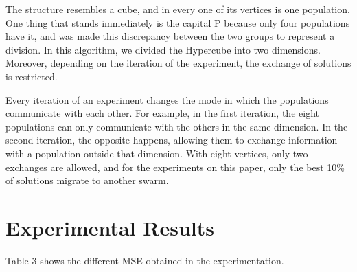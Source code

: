 \documentclass[runningheads]{llncs}
\begin{document}
The structure resembles a cube, and in every one of its vertices is one population. One thing that stands immediately is the capital P because only four populations have it, and was made this discrepancy between the two groups to represent a division. In this algorithm, we divided the Hypercube into two dimensions. Moreover, depending on the iteration of the experiment, the exchange of solutions is restricted.

Every iteration of an experiment changes the mode in which the populations communicate with each other. For example, in the first iteration, the eight populations can only communicate with the others in the same dimension. In the second iteration, the opposite happens, allowing them to exchange information with a population outside that dimension.   With eight vertices, only two exchanges are allowed, and for the experiments on this paper, only the best 10\% of solutions migrate to another swarm. 

\section{Experimental Results}
Table 3 shows the different MSE obtained in the experimentation.
\end{document}
